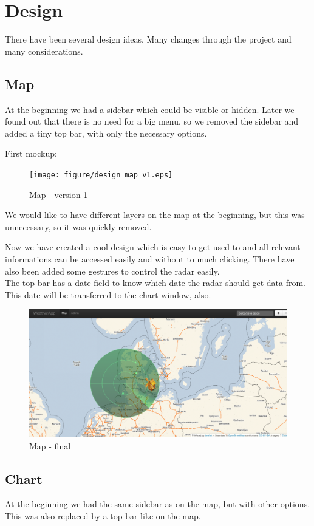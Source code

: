\chapter{Design}
There have been several design ideas. Many changes through the project and many considerations.
\section{Map}
At the beginning we had a sidebar which could be visible or hidden. Later we found out that there is no need for a big menu, so we removed the sidebar and added a tiny top bar, with only the necessary options.

First mockup:
\begin{figure}[htbp]
   \centering
   \texttt{[image: figure/design\_map\_v1.eps]}
   \caption{Map - version 1}
\end{figure}

We would like to have different layers on the map at the beginning, but this was unnecessary, so it was quickly removed.

Now we have created a cool design which is easy to get used to and all relevant informations can be accessed easily and without to much clicking.
There have also been added some gestures to control the radar easily.\\
The top bar has a date field to know which date the radar should get data from. This date will be transferred to the chart window, also.

\begin{figure}[htbp]
   \centering
   \includegraphics[scale=.3]{figure/design_map_final.eps}
   \caption{Map - final}
\end{figure}

\section{Chart}
At the beginning we had the same sidebar as on the map, but with other options. This was also replaced by a top bar like on the map.

